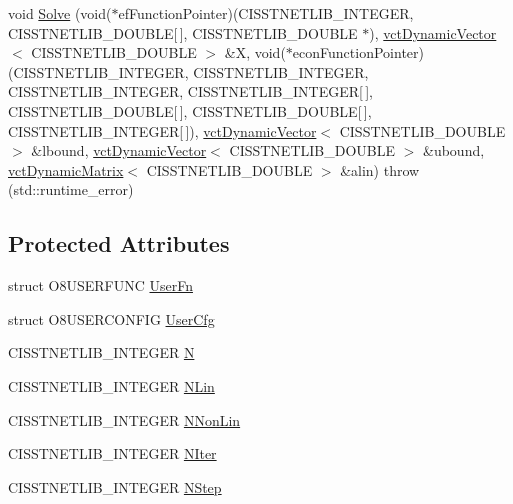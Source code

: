 \begin{DoxyCompactItemize}
\item 
void \hyperlink{classnmr_fmin_solver_a59f7eab6193a1047a251e22964529950}{Solve} (void($\ast$ef\+Function\+Pointer)(C\+I\+S\+S\+T\+N\+E\+T\+L\+I\+B\+\_\+\+I\+N\+T\+E\+G\+E\+R, C\+I\+S\+S\+T\+N\+E\+T\+L\+I\+B\+\_\+\+D\+O\+U\+B\+L\+E\mbox{[}$\,$\mbox{]}, C\+I\+S\+S\+T\+N\+E\+T\+L\+I\+B\+\_\+\+D\+O\+U\+B\+L\+E $\ast$), \hyperlink{classvct_dynamic_vector}{vct\+Dynamic\+Vector}$<$ C\+I\+S\+S\+T\+N\+E\+T\+L\+I\+B\+\_\+\+D\+O\+U\+B\+L\+E $>$ \&X, void($\ast$econ\+Function\+Pointer)(C\+I\+S\+S\+T\+N\+E\+T\+L\+I\+B\+\_\+\+I\+N\+T\+E\+G\+E\+R, C\+I\+S\+S\+T\+N\+E\+T\+L\+I\+B\+\_\+\+I\+N\+T\+E\+G\+E\+R, C\+I\+S\+S\+T\+N\+E\+T\+L\+I\+B\+\_\+\+I\+N\+T\+E\+G\+E\+R, C\+I\+S\+S\+T\+N\+E\+T\+L\+I\+B\+\_\+\+I\+N\+T\+E\+G\+E\+R\mbox{[}$\,$\mbox{]}, C\+I\+S\+S\+T\+N\+E\+T\+L\+I\+B\+\_\+\+D\+O\+U\+B\+L\+E\mbox{[}$\,$\mbox{]}, C\+I\+S\+S\+T\+N\+E\+T\+L\+I\+B\+\_\+\+D\+O\+U\+B\+L\+E\mbox{[}$\,$\mbox{]}, C\+I\+S\+S\+T\+N\+E\+T\+L\+I\+B\+\_\+\+I\+N\+T\+E\+G\+E\+R\mbox{[}$\,$\mbox{]}), \hyperlink{classvct_dynamic_vector}{vct\+Dynamic\+Vector}$<$ C\+I\+S\+S\+T\+N\+E\+T\+L\+I\+B\+\_\+\+D\+O\+U\+B\+L\+E $>$ \&lbound, \hyperlink{classvct_dynamic_vector}{vct\+Dynamic\+Vector}$<$ C\+I\+S\+S\+T\+N\+E\+T\+L\+I\+B\+\_\+\+D\+O\+U\+B\+L\+E $>$ \&ubound, \hyperlink{classvct_dynamic_matrix}{vct\+Dynamic\+Matrix}$<$ C\+I\+S\+S\+T\+N\+E\+T\+L\+I\+B\+\_\+\+D\+O\+U\+B\+L\+E $>$ \&alin)  throw (std\+::runtime\+\_\+error)
\end{DoxyCompactItemize}
\subsection*{Protected Attributes}
\begin{DoxyCompactItemize}
\item 
struct O8\+U\+S\+E\+R\+F\+U\+N\+C \hyperlink{classnmr_fmin_solver_aae14c67da4d9b2d740a1adb8873904b3}{User\+Fn}
\item 
struct O8\+U\+S\+E\+R\+C\+O\+N\+F\+I\+G \hyperlink{classnmr_fmin_solver_a7116a6ed46d966947aaf356e22028a5d}{User\+Cfg}
\item 
C\+I\+S\+S\+T\+N\+E\+T\+L\+I\+B\+\_\+\+I\+N\+T\+E\+G\+E\+R \hyperlink{classnmr_fmin_solver_ab326c4ad9de626447c1ddd93e3be57c1}{N}
\item 
C\+I\+S\+S\+T\+N\+E\+T\+L\+I\+B\+\_\+\+I\+N\+T\+E\+G\+E\+R \hyperlink{classnmr_fmin_solver_a0e26ac271bc1782ceacbafd644f2ed8c}{N\+Lin}
\item 
C\+I\+S\+S\+T\+N\+E\+T\+L\+I\+B\+\_\+\+I\+N\+T\+E\+G\+E\+R \hyperlink{classnmr_fmin_solver_a3dc96e979c554f7f270cd9957372c801}{N\+Non\+Lin}
\item 
C\+I\+S\+S\+T\+N\+E\+T\+L\+I\+B\+\_\+\+I\+N\+T\+E\+G\+E\+R \hyperlink{classnmr_fmin_solver_ab4781ddbf8c710e1758195e8d7024382}{N\+Iter}
\item 
C\+I\+S\+S\+T\+N\+E\+T\+L\+I\+B\+\_\+\+I\+N\+T\+E\+G\+E\+R \hyperlink{classnmr_fmin_solver_a597036b665386a5e4fcc0028843d1bc3}{N\+Step}
\end{DoxyCompactItemize}


